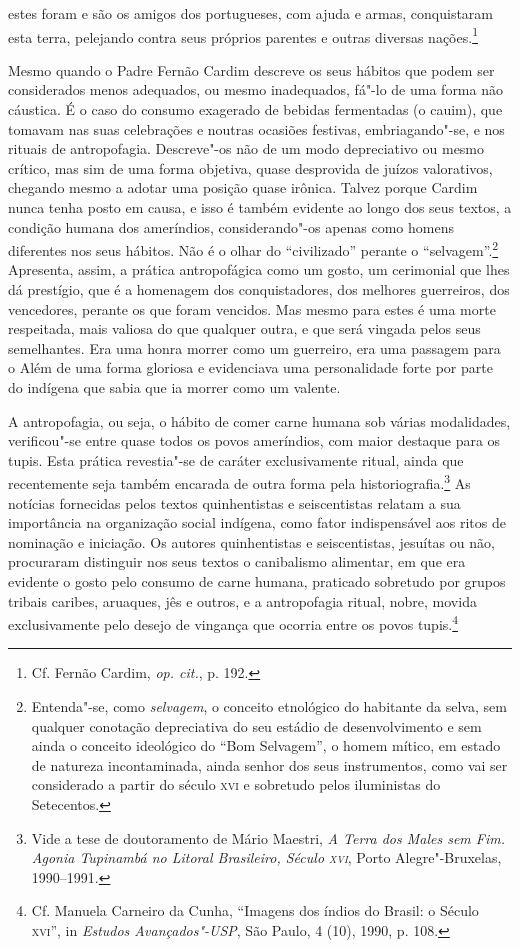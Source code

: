 \begin{hedraquote}
[\ldots] estes foram e são os amigos dos portugueses, com ajuda e
armas, conquistaram esta terra, pelejando contra seus próprios parentes
e outras diversas nações.\footnote{ Cf. Fernão Cardim, \textit{op. cit.}, p. 192.}
\end{hedraquote}

 Mesmo quando o Padre Fernão Cardim descreve os seus
hábitos que podem ser considerados menos adequados, ou mesmo
inadequados, fá"-lo de uma forma não cáustica. É o caso do consumo
exagerado de bebidas fermentadas (o cauim), que tomavam nas
suas celebrações e noutras ocasiões festivas, embriagando"-se, e nos
rituais de antropofagia. Descreve"-os não de um modo depreciativo ou
mesmo crítico, mas sim de uma forma objetiva, quase desprovida de
juízos valorativos, chegando mesmo a adotar uma posição quase irônica.
Talvez porque Cardim nunca tenha posto em causa, e isso é também
evidente ao longo dos seus textos, a condição humana dos ameríndios,
considerando"-os apenas como homens diferentes nos seus hábitos. Não é
o olhar do ``civilizado'' perante o ``selvagem''.\footnote{ Entenda"-se, 
como \textit{selvagem}, o conceito etnológico do habitante
da selva, sem qualquer conotação depreciativa do seu estádio de
desenvolvimento e sem ainda o conceito ideológico do ``Bom Selvagem'',
o homem mítico, em estado de natureza incontaminada, ainda senhor dos
seus instrumentos, como vai ser considerado a partir do século \textsc{xvi} e
sobretudo pelos iluministas do Setecentos.} Apresenta, assim, a 
prática antropofágica como um gosto, um cerimonial que lhes dá prestígio, que é a
homenagem dos conquistadores, dos melhores guerreiros, dos vencedores,
perante os que foram vencidos. Mas mesmo para estes é uma morte
respeitada, mais valiosa do que qualquer outra, e que será vingada
pelos seus semelhantes. Era uma honra morrer como um guerreiro, era uma
passagem para o Além de uma forma gloriosa e evidenciava uma
personalidade forte por parte do indígena que sabia que ia morrer como um valente.

 A antropofagia, ou seja, o hábito de comer carne humana sob várias
modalidades, verificou"-se entre quase todos os povos ameríndios, com
maior destaque para os tupis. Esta prática revestia"-se de caráter
exclusivamente ritual, ainda que recentemente seja também encarada de
outra forma pela historiografia.\footnote{ Vide a tese de
doutoramento de Mário Maestri, \textit{A Terra dos Males sem Fim.
Agonia Tupinambá no Litoral Brasileiro, Século \textsc{xvi}}, Porto
Alegre"-Bruxelas, 1990--1991.} As notícias fornecidas pelos textos
quinhentistas e seiscentistas relatam a sua importância na organização
social indígena, como fator indispensável aos ritos de nominação e
iniciação. Os autores quinhentistas e seiscentistas, jesuítas ou não,
procuraram distinguir nos seus textos o canibalismo alimentar, em que
era evidente o gosto pelo consumo de carne humana, praticado sobretudo
por grupos tribais caribes, aruaques, jês e outros, e a antropofagia
ritual, nobre, movida exclusivamente pelo desejo de vingança que
ocorria entre os povos tupis.\footnote{ Cf. Manuela Carneiro da
Cunha, ``Imagens dos índios do Brasil: o Século \textsc{xvi}'', in
\textit{Estudos Avançados"-USP}, São Paulo, 4 (10), 1990, p. 108.} 


